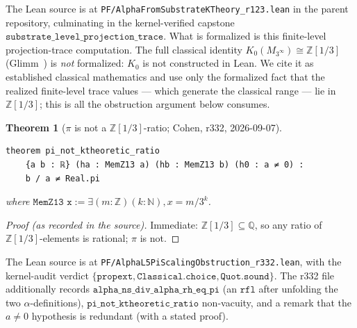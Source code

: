 \documentclass[11pt,a4paper]{article}
\theoremstyle{plain}
\newtheorem{theorem}{Theorem}[section]
\theoremstyle{definition}
\begin{document}
The Lean source is at \texttt{PF/AlphaFromSubstrateKTheory\_r123.lean} in the parent repository, culminating in the kernel-verified capstone $\texttt{substrate\_level\_projection\_trace}$. What is formalized is this finite-level projection-trace computation. The full classical identity $K_0(M_{3^{\infty}}) \cong \mathbb{Z}[1/3]$ (Glimm~\cite{glimm1960}) is \emph{not} formalized: $K_0$ is not constructed in Lean. We cite it as established classical mathematics and use only the formalized fact that the realized finite-level trace values --- which generate the classical range --- lie in $\mathbb{Z}[1/3]$; this is all the obstruction argument below consumes.

\begin{theorem}[{$\pi$ is not a $\mathbb{Z}[1/3]$-ratio; Cohen, r332, 2026-09-07}]
\label{thm:obstruction}
\begin{lstlisting}
theorem pi_not_ktheoretic_ratio
    {a b : ℝ} (ha : MemZ13 a) (hb : MemZ13 b) (h0 : a ≠ 0) :
    b / a ≠ Real.pi
\end{lstlisting}
where $\texttt{MemZ13 x} := \exists (m : \mathbb{Z})(k : \mathbb{N}), x = m / 3^k$.
\end{theorem}

\begin{proof}[Proof (as recorded in the source)]
Immediate: $\mathbb{Z}[1/3] \subseteq \mathbb{Q}$, so any ratio of $\mathbb{Z}[1/3]$-elements is rational; $\pi$ is not.
\end{proof}

The Lean source is at \texttt{PF/AlphaL5PiScalingObstruction\_r332.lean}, with the kernel-audit verdict $\{\texttt{propext}, \texttt{Classical.choice}, \texttt{Quot.sound}\}$. The r332 file additionally records $\texttt{alpha\_ns\_div\_alpha\_rh\_eq\_pi}$ (an $\texttt{rfl}$ after unfolding the two $\alpha$-definitions), $\texttt{pi\_not\_ktheoretic\_ratio}$ non-vacuity, and a remark that the $a \neq 0$ hypothesis is redundant (with a stated proof).
\end{document}
